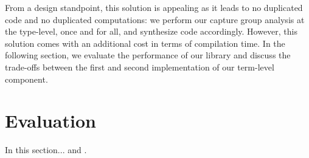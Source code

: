 From a design standpoint, this solution is appealing as it leads to no duplicated code and no duplicated computations: we perform our capture group analysis at the type-level, once and for all, and synthesize code accordingly.
However, this solution comes with an additional cost in terms of compilation time.
In the following section, we evaluate the performance of our library and discuss the trade-offs between the first and second implementation of our term-level component.

\section{Evaluation}

In this section... \citep{w3c1994xquery} and \citep{w3c1994qt3ts}.
